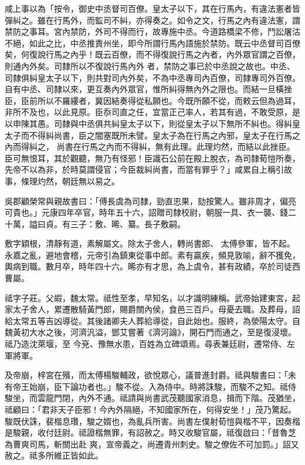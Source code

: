 \begin{pinyinscope}
 咸上事以為「按令，御史中丞督司百僚。皇太子以下，其在行馬內，有違法憲者皆彈糾之。雖在行馬外，而監司不糾，亦得奏之。如令之文，行馬之內有違法憲，謂禁防之事耳。宮內禁防，外司不得而行，故專施中丞。今道路橋梁不修，鬥訟屠沽不絕，如此之比，中丞推責州坐，即今所謂行馬內語施於禁防。既云中丞督司百僚矣，何復說行馬之內乎！既云百僚，而不得復說行馬之內者，內外眾官謂之百僚，則通內外矣。司隸所以不復說行馬內外
 者，禁防之事已於中丞說之故也。中丞、司隸俱糾皇太子以下，則共對司內外矣，不為中丞專司內百僚，司隸專司外百僚。自有中丞、司隸以來，更互奏內外眾官，惟所糾得無內外之限也。而結一旦橫挫臣，臣前所以不羅縷者，冀因結奏得從私願也。今既所願不從，而敕云但為過耳，非所不及也，以此見原。臣忝司直之任，宜當正己率人，若其有過，不敢受原，是以申陳其愚。司隸與中丞俱共糾皇太子以下，則從皇太子以下無所不糾也。得糾皇太子而不得糾尚書，臣之闇塞既所未譬。皇太子為在行馬之內邪，皇太子在行馬之內而得糾之，
 尚書在行馬之內而不得糾，無有此理。此理灼然，而結以此挫臣。臣可無恨耳，其於觀聽，無乃有怪邪！臣識石公前在殿上脫衣，為司隸荀愷所奏，先帝不以為非，於時莫謂侵官；今臣裁糾尚書，而當有罪乎？」咸累自上稱引故事，條理灼然，朝廷無以易之。



 吳郡顧榮常與親故書曰：「傅長虞為司隸，勁直忠果，劾按驚人。雖非周才，偏亮可貴也。」元康四年卒官，時年五十六，詔贈司隸校尉，朝服一具、衣一襲、錢二十萬，謚曰貞。有三子：敷、晞、纂。長子敷嗣。



 敷字穎根，清靜有道，素解屬文。除太子舍人，轉尚書郎、
 太傅參軍，皆不起。永嘉之亂，避地會稽，元帝引為鎮東從事中郎。素有贏疾，頻見敦喻，辭不獲免，輿病到職。數月卒，時年四十六。晞亦有才思，為上虞令，甚有政績，卒於司徒西曹屬。



 祗字子莊。父嘏，魏太常。祗性至孝，早知名，以才識明練稱。武帝始建東宮，起家太子舍人，累遷散騎黃門郎，賜爵關內侯，食邑三百戶。母憂去職。及葬母，詔給太常五等吉凶導從。其後諸卿夫人葬給導從，自此始也。服終，為滎陽太守。自魏黃初大水之後，河濟汎溢，鄧艾嘗著《濟河論》，開石門而通之，至是復浸壞。祗乃造沈萊堰，至
 今兗、豫無水患，百姓為立碑頌焉。尋表兼廷尉，遷常侍、左軍將軍。



 及帝崩，梓宮在殯，而太傅楊駿輔政，欲悅眾心，議普進封爵。祗與駿書曰：「未有帝王始崩，臣下論功者也。」駿不從。入為侍中。時將誅駿，而駿不之知。祗侍駿坐，而雲龍門閉，內外不通。祗請與尚書武茂聽國家消息，揖而下階。茂猶坐，祗顧曰：「君非天子臣邪！今內外隔絕，不知國家所在，何得安坐！」茂乃驚起。駿既伏誅，裴楷息瓚，駿之婿也，為亂兵所害。尚書左僕射荀愷與楷不平，因奏楷是駿親，收付廷尉。祗證楷無罪，有詔赦之。時又收駿官屬，祗復啟曰：「昔魯芝為曹爽司馬，斬關出赴
 爽，宣帝義之，尚遷青州刺史。駿之僚佐不可加罰。」詔又赦之。祗多所維正皆如此。




\end{pinyinscope}
